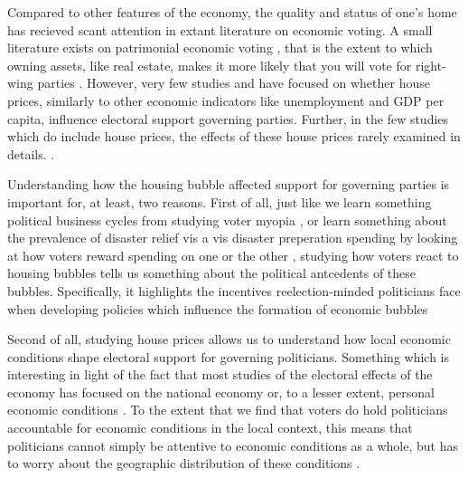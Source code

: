 \documentclass[12pt,a4paper]{article}
\begin{document}
Compared to other features of the economy, the quality and status of one's home has recieved scant attention in extant literature on economic voting. A small literature exists on patrimonial economic voting \citep{nadeau2010patrimonial,stubager2013reaching}, that is the extent to which owning assets, like real estate, makes it more likely that you will vote for right-wing parties \citep[see][for a similar argument]{ansell2014political}. However, very few studies and have focused on whether house prices, similarly to other economic indicators like unemployment and GDP per capita, influence electoral support governing parties. Further, in the few studies which do include house prices, the effects of these house prices rarely examined in details.  \citep[e.g.]{hopkins2015economic}. 


Understanding how the housing bubble affected support for governing parties is important for, at least, two reasons. First of all, just like we learn something political business cycles from studying voter myopia \citep{healy2014substituting,tufte1980political}, or learn something about the prevalence of disaster relief vis a vis disaster preperation spending by looking at how voters reward spending on one or the other \citep{healy2009myopic,ashworth2012electoral}, studying how voters react to housing bubbles tells us something about the political antcedents of these bubbles. Specifically, it highlights the incentives reelection-minded politicians face when developing policies which influence the formation of economic bubbles

Second of all, studying house prices allows us to understand how local economic conditions shape electoral support for governing politicians. Something which is interesting in light of the fact that most studies of the electoral effects of the economy has focused on the national economy or, to a lesser extent, personal economic conditions \citep[290]{healy2013retrospective}. To the extent that we find that voters do hold politicians accountable for economic conditions in the local context, this means that politicians cannot simply be attentive to economic conditions as a whole, but has to worry about the geographic distribution of these conditions \citep[cf.][11]{ferejohn1986incumbent}. 
\end{document}
